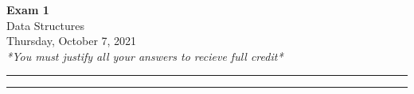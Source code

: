 \documentclass[a4paper,12pt]{article}
\begin{document}
\begin{center}
{\bf\Huge Exam 1} \\[5pt]
Data Structures \\
Thursday, October 7, 2021\\[5pt]
\textit{*You must justify all your answers to recieve full credit*}
\end{center}

\hrule
\vspace{2pt}
\hrule
\vspace{12pt}






\end{document}
